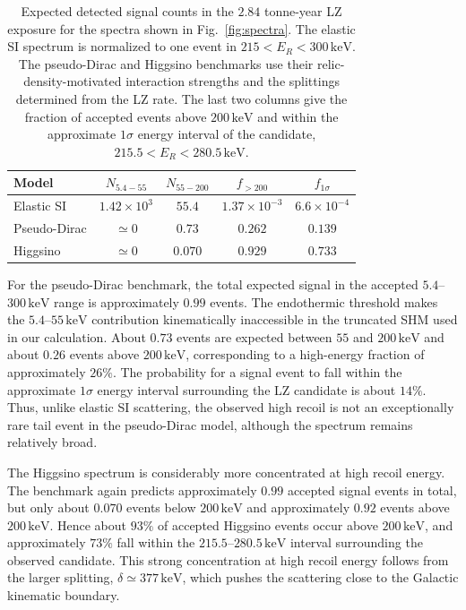 \documentclass[aps,prd,reprint,superscriptaddress,nofootinbib,longbibliography,floatfix]{revtex4-2}
\newcommand{\keV}{\mathrm{keV}}
\begin{document}
\begin{table}[t]
\caption{Expected detected signal counts in the $2.84$ tonne-year LZ exposure for the spectra shown in Fig.~\ref{fig:spectra}. The elastic SI spectrum is normalized to one event in $215<E_R<300\,\keV$. The pseudo-Dirac and Higgsino benchmarks use their relic-density-motivated interaction strengths and the splittings determined from the LZ rate. The last two columns give the fraction of accepted events above $200\,\keV$ and within the approximate $1\sigma$ energy interval of the candidate, $215.5<E_R<280.5\,\keV$.}
\label{tab:spectralcounts}
\begin{ruledtabular}
\begin{tabular}{lcccc}
Model & $N_{5.4-55}$ & $N_{55-200}$ & $f_{>200}$ & $f_{1\sigma}$\\
\hline
Elastic SI & $1.42\times10^{3}$ & $55.4$ & $1.37\times10^{-3}$ & $6.6\times10^{-4}$\\
Pseudo-Dirac & $\simeq0$ & $0.73$ & $0.262$ & $0.139$\\
Higgsino & $\simeq0$ & $0.070$ & $0.929$ & $0.733$\\
\end{tabular}
\end{ruledtabular}
\end{table}

For the pseudo-Dirac benchmark, the total expected signal in the accepted $5.4$--$300\,\keV$ range is approximately $0.99$ events. The endothermic threshold makes the $5.4$--$55\,\keV$ contribution kinematically inaccessible in the truncated SHM used in our calculation. About $0.73$ events are expected between $55$ and $200\,\keV$ and about $0.26$ events above $200\,\keV$, corresponding to a high-energy fraction of approximately $26\%$. The probability for a signal event to fall within the approximate $1\sigma$ energy interval surrounding the LZ candidate is about $14\%$. Thus, unlike elastic SI scattering, the observed high recoil is not an exceptionally rare tail event in the pseudo-Dirac model, although the spectrum remains relatively broad.

The Higgsino spectrum is considerably more concentrated at high recoil energy. The benchmark again predicts approximately $0.99$ accepted signal events in total, but only about $0.070$ events below $200\,\keV$ and approximately $0.92$ events above $200\,\keV$. Hence about $93\%$ of accepted Higgsino events occur above $200\,\keV$, and approximately $73\%$ fall within the $215.5$--$280.5\,\keV$ interval surrounding the observed candidate. This strong concentration at high recoil energy follows from the larger splitting, $\delta\simeq377\,\keV$, which pushes the scattering close to the Galactic kinematic boundary.
\end{document}
